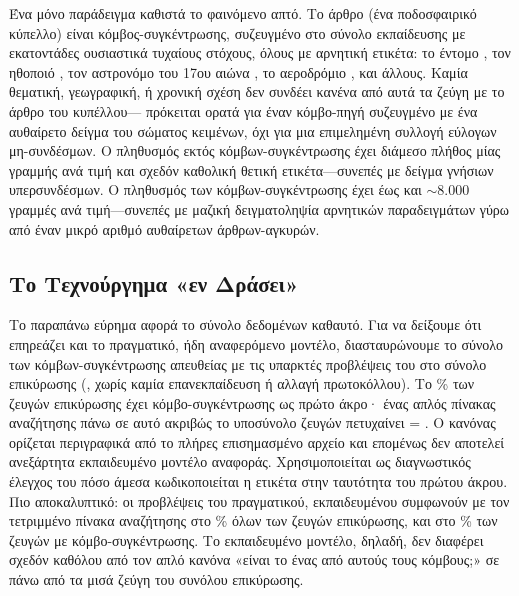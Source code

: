 Ένα μόνο παράδειγμα καθιστά το φαινόμενο απτό.
Το άρθρο  (ένα ποδοσφαιρικό κύπελλο) είναι κόμβος-συγκέντρωσης,
συζευγμένο στο σύνολο εκπαίδευσης με εκατοντάδες ουσιαστικά τυχαίους στόχους,
όλους με αρνητική ετικέτα: το έντομο , τον ηθοποιό , τον αστρονόμο του 17ου αιώνα , το
αεροδρόμιο , και άλλους.
Καμία θεματική, γεωγραφική, ή
χρονική σχέση δεν συνδέει κανένα από αυτά τα ζεύγη με το άρθρο του κυπέλλου---
πρόκειται ορατά για έναν κόμβο-πηγή συζευγμένο με ένα αυθαίρετο δείγμα του
σώματος κειμένων, όχι για μια επιμελημένη συλλογή εύλογων μη-συνδέσμων.
Ο
πληθυσμός εκτός κόμβων-συγκέντρωσης έχει διάμεσο πλήθος μίας γραμμής ανά τιμή
\texttt{} και σχεδόν καθολική θετική ετικέτα---συνεπές με δείγμα
γνήσιων υπερσυνδέσμων.
Ο πληθυσμός των κόμβων-συγκέντρωσης έχει έως και
$\sim$8.000 γραμμές ανά τιμή---συνεπές με μαζική δειγματοληψία αρνητικών
παραδειγμάτων γύρω από έναν μικρό αριθμό αυθαίρετων άρθρων-αγκυρών.

\subsection{Το Τεχνούργημα «εν Δράσει»}
\label{subsec:hub-in-action}

Το παραπάνω εύρημα αφορά το σύνολο δεδομένων καθαυτό.
Για να δείξουμε ότι
επηρεάζει και το πραγματικό, ήδη αναφερόμενο μοντέλο, διασταυρώνουμε το
σύνολο των \HubCount{} κόμβων-συγκέντρωσης απευθείας με τις υπαρκτές
προβλέψεις του  στο σύνολο επικύρωσης
(\texttt{},
χωρίς καμία επανεκπαίδευση ή αλλαγή πρωτοκόλλου).
Το \HubValSourcedPct\% των
\ValSplitSize{} ζευγών επικύρωσης έχει κόμβο-συγκέντρωσης ως πρώτο άκρο· ένας
απλός πίνακας αναζήτησης πάνω σε αυτό ακριβώς το υποσύνολο ζευγών πετυχαίνει
 = \HubValLookupFone{}.
Ο κανόνας ορίζεται περιγραφικά από το πλήρες επισημασμένο αρχείο και επομένως
δεν αποτελεί ανεξάρτητα εκπαιδευμένο μοντέλο αναφοράς.
Χρησιμοποιείται ως
διαγνωστικός έλεγχος του πόσο άμεσα κωδικοποιείται η ετικέτα στην ταυτότητα
του πρώτου άκρου.
Πιο αποκαλυπτικό: οι προβλέψεις του πραγματικού, εκπαιδευμένου
 συμφωνούν με τον τετριμμένο πίνακα αναζήτησης στο
\HubValAgreementPct\% όλων των ζευγών επικύρωσης, και στο
\HubValHubAgreementPct\% των ζευγών με κόμβο-συγκέντρωσης.
Το εκπαιδευμένο
μοντέλο, δηλαδή, δεν διαφέρει σχεδόν καθόλου από τον απλό κανόνα «είναι το
\texttt{} ένας από αυτούς τους \HubCount{} κόμβους;» σε πάνω από τα
μισά ζεύγη του συνόλου επικύρωσης.

